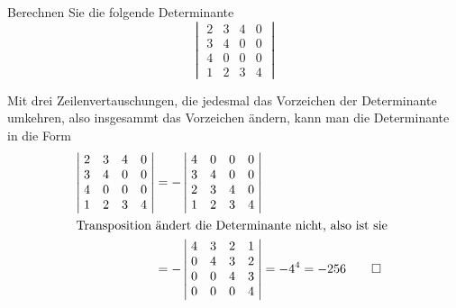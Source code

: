 Berechnen Sie die folgende Determinante
\[
\left|\;
\begin{matrix}
2&3&4&0\\
3&4&0&0\\
4&0&0&0\\
1&2&3&4
\end{matrix}\;
\right|
\]


\begin{loesung}
Mit drei Zeilenvertauschungen, die jedesmal das Vorzeichen der
Determinante umkehren, also insgesammt das Vorzeichen ändern,
kann man die Determinante in die Form
\begin{align*}
\left|\;
\begin{matrix}
2&3&4&0\\
3&4&0&0\\
4&0&0&0\\
1&2&3&4
\end{matrix}\;
\right|
&=
-\left|\;
\begin{matrix}
4&0&0&0\\
3&4&0&0\\
2&3&4&0\\
1&2&3&4
\end{matrix}\;
\right|
\\
\intertext{%
Transposition ändert die Determinante nicht, also ist sie
}
&=
-\left|\;
\begin{matrix}
4&3&2&1\\
0&4&3&2\\
0&0&4&3\\
0&0&0&4
\end{matrix}\;
\right|=-4^4=-256
\qedhere
\end{align*}
\end{loesung}

